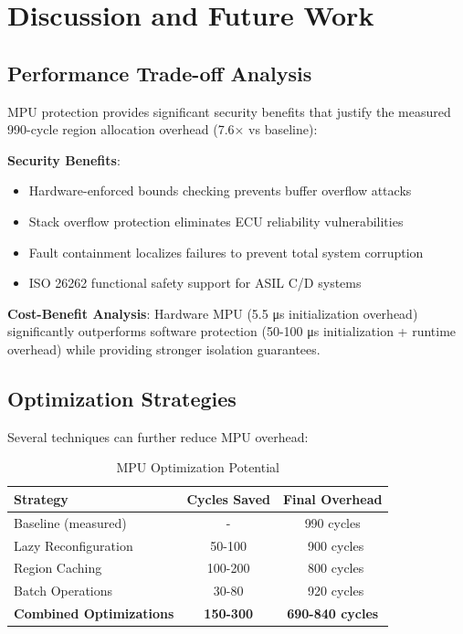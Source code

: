 \chapter{Discussion and Future Work}
\label{sec:optimization}

\section{Performance Trade-off Analysis}

MPU protection provides significant security benefits that justify the measured 990-cycle region allocation overhead (7.6× vs baseline):

\textbf{Security Benefits}:
\begin{itemize}
    \item Hardware-enforced bounds checking prevents buffer overflow attacks
    \item Stack overflow protection eliminates ECU reliability vulnerabilities
    \item Fault containment localizes failures to prevent total system corruption
    \item ISO 26262 functional safety support for ASIL C/D systems
\end{itemize}

\textbf{Cost-Benefit Analysis}: Hardware MPU (5.5 μs initialization overhead) significantly outperforms software protection (50-100 μs initialization + runtime overhead) while providing stronger isolation guarantees.

\section{Optimization Strategies}

Several techniques can further reduce MPU overhead:

\begin{table}[h]
\centering
\caption{MPU Optimization Potential}
\begin{tabular}{@{}lcc@{}}
\toprule
Strategy & Cycles Saved & Final Overhead \\
\midrule
Baseline (measured) & - & 990 cycles \\
Lazy Reconfiguration & 50-100 & ~900 cycles \\
Region Caching & 100-200 & ~800 cycles \\
Batch Operations & 30-80 & ~920 cycles \\
\textbf{Combined Optimizations} & \textbf{150-300} & \textbf{690-840 cycles} \\
\bottomrule
\end{tabular}
\end{table}

